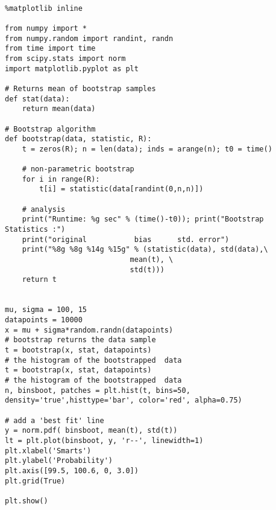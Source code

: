 \begin{verbatim}

%matplotlib inline

from numpy import *
from numpy.random import randint, randn
from time import time
from scipy.stats import norm
import matplotlib.pyplot as plt

# Returns mean of bootstrap samples                                                                                                                                                
def stat(data):
    return mean(data)

# Bootstrap algorithm                                                                                                                                                              
def bootstrap(data, statistic, R):
    t = zeros(R); n = len(data); inds = arange(n); t0 = time()

    # non-parametric bootstrap                                                                                                                                                     
    for i in range(R):
        t[i] = statistic(data[randint(0,n,n)])

    # analysis                                                                                                                                                                     
    print("Runtime: %g sec" % (time()-t0)); print("Bootstrap Statistics :")
    print("original           bias      std. error")
    print("%8g %8g %14g %15g" % (statistic(data), std(data),\
                             mean(t), \
                             std(t)))
    return t


mu, sigma = 100, 15
datapoints = 10000
x = mu + sigma*random.randn(datapoints)
# bootstrap returns the data sample                                                                                                          t = bootstrap(x, stat, datapoints)
# the histogram of the bootstrapped  data  
t = bootstrap(x, stat, datapoints)
# the histogram of the bootstrapped  data                                            
n, binsboot, patches = plt.hist(t, bins=50, density='true',histtype='bar', color='red', alpha=0.75)

# add a 'best fit' line                                                                                                                                                          
y = norm.pdf( binsboot, mean(t), std(t))
lt = plt.plot(binsboot, y, 'r--', linewidth=1)
plt.xlabel('Smarts')
plt.ylabel('Probability')
plt.axis([99.5, 100.6, 0, 3.0])
plt.grid(True)

plt.show()


\end{verbatim}


